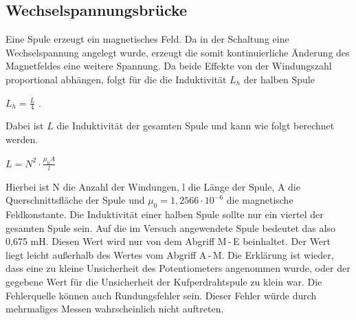 \documentclass[a4paper,usenatbib]{aspdoc}
\begin{document}
        \subsection{Wechselspannungsbrücke}\label{subsec:discussion_wechsel}
            Eine Spule erzeugt ein magnetisches Feld. Da in der Schaltung eine Wechselspannung angelegt wurde, erzeugt die somit kontinuierliche Änderung des Magnetfeldes eine weitere Spannung. Da beide Effekte von der Windungszahl proportional abhängen, folgt für die die Induktivität $L_h$ der halben Spule 
            \begin{center}
                $L_h = \frac{L}{4}$ \quad .
            \end{center}
            Dabei ist $L$ die Induktivität der gesamten Spule und kann wie folgt berechnet werden.\\
            \begin{center}
                $L = N^2 \cdot \frac{\mu_0A}{l}$
            \end{center}
            Hierbei ist N die Anzahl der Windungen, l die Länge der Spule, A die Querschnittsfläche der Spule und $\mu_0 = 1,2566 \cdot 10^{-6}$ \si{} die magnetische Feldkonstante. 
            Die Induktivität einer halben Spule sollte nur ein viertel der gesamten Spule sein. Auf die im Versuch angewendete Spule bedeutet das also 0,675 \si{\milli\henry}. Diesen Wert wird nur von dem Abgriff M\,-\,E beinhaltet. Der Wert liegt leicht außerhalb des Wertes vom Abgriff A\,-\,M. Die Erklärung ist wieder, dass eine zu kleine Unsicherheit des Potentiometers angenommen wurde, oder der gegebene Wert für die Unsicherheit der Kufperdrahtspule zu klein war. Die Fehlerquelle können auch Rundungsfehler sein. Dieser Fehler würde durch mehrmaliges Messen wahrscheinlich nicht auftreten.\\
            

        
       
\end{document}
